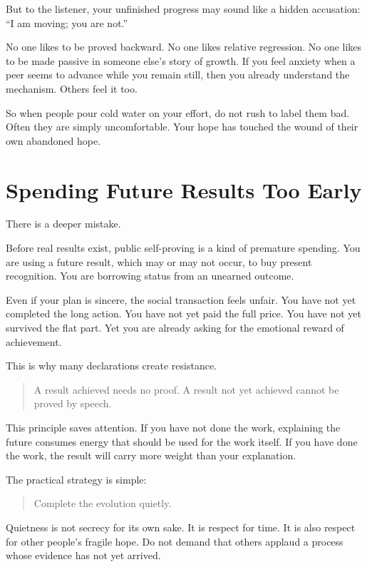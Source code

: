 But to the listener, your unfinished progress may sound like a hidden accusation: ``I am moving; you are not.''

No one likes to be proved backward. No one likes relative regression. No one likes to be made passive in someone else's story of growth. If you feel anxiety when a peer seems to advance while you remain still, then you already understand the mechanism. Others feel it too.

So when people pour cold water on your effort, do not rush to label them bad. Often they are simply uncomfortable. Your hope has touched the wound of their own abandoned hope.

\section*{Spending Future Results Too Early}

There is a deeper mistake.

Before real results exist, public self-proving is a kind of premature spending. You are using a future result, which may or may not occur, to buy present recognition. You are borrowing status from an unearned outcome.

Even if your plan is sincere, the social transaction feels unfair. You have not yet completed the long action. You have not yet paid the full price. You have not yet survived the flat part. Yet you are already asking for the emotional reward of achievement.

This is why many declarations create resistance.

\begin{quote}
A result achieved needs no proof. A result not yet achieved cannot be proved by speech.
\end{quote}

This principle saves attention. If you have not done the work, explaining the future consumes energy that should be used for the work itself. If you have done the work, the result will carry more weight than your explanation.

The practical strategy is simple:

\begin{quote}
Complete the evolution quietly.
\end{quote}

Quietness is not secrecy for its own sake. It is respect for time. It is also respect for other people's fragile hope. Do not demand that others applaud a process whose evidence has not yet arrived.


